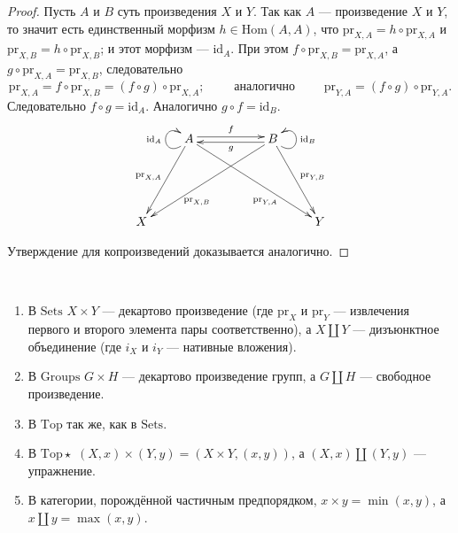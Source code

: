 \documentclass[12pt,a4paper]{article}
\newcommand{\Hom}{\mathrm{Hom}}
\newcommand{\id}{\mathrm{id}}
\newcommand{\Sets}{\mathrm{Sets}}
\newcommand{\Groups}{\mathrm{Groups}}
\newcommand{\Top}{\mathrm{Top}}
\newcommand{\Topstar}{\mathrm{Top\star}}
\newcommand{\pr}{\mathrm{pr}}
\begin{document}
    \begin{proof}
        Пусть $A$ и $B$ суть произведения $X$ и $Y$. Так как $A$ --- произведение $X$ и $Y$, то значит есть единственный морфизм $h \in \Hom(A, A)$, что $\pr_{X, A} = h \circ \pr_{X, A}$ и $\pr_{X, B} = h \circ \pr_{X, B}$; и этот морфизм --- $\id_A$. При этом $f \circ \pr_{X, B} = \pr_{X, A}$, а $g \circ \pr_{X, A} = \pr_{X, B}$, следовательно
        \[
            \pr_{X, A} = f \circ \pr_{X, B} = (f \circ g) \circ \pr_{X, A};
            \qquad \text{ аналогично } \qquad
            \pr_{Y, A} = (f \circ g) \circ \pr_{Y, A}.
        \]
        Следовательно $f \circ g = \id_A$. Аналогично $g \circ f = \id_B$.
        \[
            \xymatrix{
                &A \ar@(dl,ul)[]^{\id_A} \ar[ddl]_{\pr_{X, A}} \ar[ddrrr]_(.66){\pr_{Y, A}} \ar@<0.5ex>[rr]^{f} && B \ar@(dr,ur)[]_{\id_B} \ar[ddlll]^(.66){\pr_{X, B}} \ar[ddr]^{\pr_{Y, B}} \ar@<0.5ex>[ll]^{g}\\\\
                X &&&& Y
            }
        \]

        Утверждение для копроизведений доказывается аналогично.
    \end{proof}

    \begin{example}\ 
        \begin{enumerate}
            \item В $\Sets$ $X \times Y$ --- декартово произведение (где $\pr_X$ и $\pr_Y$ --- извлечения первого и второго элемента пары соответственно), а $X \amalg Y$ --- дизъюнктное объединение (где $i_X$ и $i_Y$ --- нативные вложения).
            \item В $\Groups$ $G \times H$ --- декартово произведение групп, а $G \amalg H$ --- свободное произведение.
            \item В $\Top$ так же, как в $\Sets$.
            \item В $\Topstar$ $(X, x) \times (Y, y) = (X \times Y, (x, y))$, а $(X, x) \amalg (Y, y)$ --- упражнение.
            \item В категории, порождённой частичным предпорядком, $x \times y = \min(x, y)$, а $x \amalg y = \max(x, y)$.
        \end{enumerate}
    \end{example}
\end{document}
